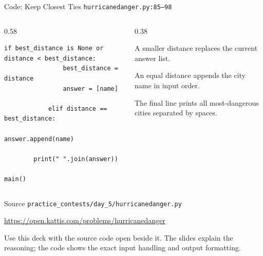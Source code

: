 \documentclass[aspectratio=169,11pt]{beamer}
\begin{document}
\begin{frame}[fragile]{Code: Keep Closest Ties}
\scriptsize
{} \texttt{hurricanedanger.py:85--98}

\vspace{0.08cm}
\begin{columns}[T,totalwidth=\textwidth]
\begin{column}{0.58\textwidth}
\begin{lstlisting}[style=cpcode]
            if best_distance is None or distance < best_distance:
                best_distance = distance
                answer = [name]

            elif distance == best_distance:
                answer.append(name)

        print(" ".join(answer))

main()
\end{lstlisting}
\end{column}
\begin{column}{0.38\textwidth}
\begin{tightitemize}
  \item A smaller distance replaces the current answer list.
  \item An equal distance appends the city name in input order.
  \item The final line prints all most-dangerous cities separated by spaces.
\end{tightitemize}
\end{column}
\end{columns}
\end{frame}

\begin{frame}{Source}
\small
{} \texttt{practice\_contests/day\_5/hurricanedanger.py}

\vspace{0.3cm}
 \url{https://open.kattis.com/problems/hurricanedanger}

\vspace{0.45cm}
Use this deck with the source code open beside it. The slides explain the reasoning; the code shows the exact input handling and output formatting.
\end{frame}
\end{document}
